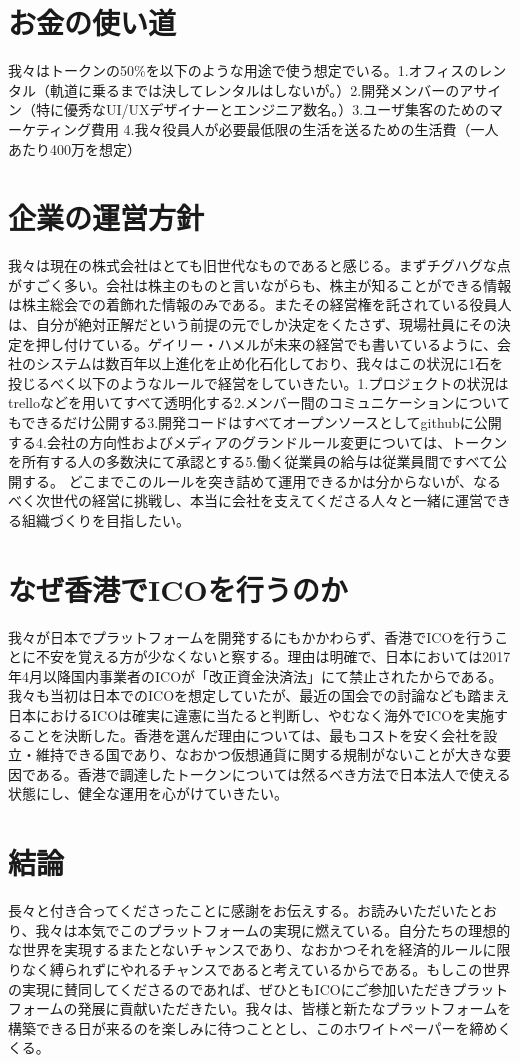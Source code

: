 \documentclass{jsarticle}
\begin{document}
\section{お金の使い道}
我々はトークンの50\%を以下のような用途で使う想定でいる。1.オフィスのレンタル（軌道に乗るまでは決してレンタルはしないが。）2.開発メンバーのアサイン（特に優秀なUI/UXデザイナーとエンジニア数名。）3.ユーザ集客のためのマーケティング費用 4.我々役員人が必要最低限の生活を送るための生活費（一人あたり400万を想定）
\section{企業の運営方針}
我々は現在の株式会社はとても旧世代なものであると感じる。まずチグハグな点がすごく多い。会社は株主のものと言いながらも、株主が知ることができる情報は株主総会での着飾れた情報のみである。またその経営権を託されている役員人は、自分が絶対正解だという前提の元でしか決定をくたさず、現場社員にその決定を押し付けている。ゲイリー・ハメルが未来の経営でも書いているように、会社のシステムは数百年以上進化を止め化石化しており、我々はこの状況に1石を投じるべく以下のようなルールで経営をしていきたい。1.プロジェクトの状況はtrelloなどを用いてすべて透明化する2.メンバー間のコミュニケーションについてもできるだけ公開する3.開発コードはすべてオープンソースとしてgithubに公開する4.会社の方向性およびメディアのグランドルール変更については、トークンを所有する人の多数決にて承認とする5.働く従業員の給与は従業員間ですべて公開する。 どこまでこのルールを突き詰めて運用できるかは分からないが、なるべく次世代の経営に挑戦し、本当に会社を支えてくださる人々と一緒に運営できる組織づくりを目指したい。
\section{なぜ香港でICOを行うのか}
我々が日本でプラットフォームを開発するにもかかわらず、香港でICOを行うことに不安を覚える方が少なくないと察する。理由は明確で、日本においては2017年4月以降国内事業者のICOが「改正資金決済法」にて禁止されたからである。我々も当初は日本でのICOを想定していたが、最近の国会での討論なども踏まえ日本におけるICOは確実に違憲に当たると判断し、やむなく海外でICOを実施することを決断した。香港を選んだ理由については、最もコストを安く会社を設立・維持できる国であり、なおかつ仮想通貨に関する規制がないことが大きな要因である。香港で調達したトークンについては然るべき方法で日本法人で使える状態にし、健全な運用を心がけていきたい。
\section{結論}
長々と付き合ってくださったことに感謝をお伝えする。お読みいただいたとおり、我々は本気でこのプラットフォームの実現に燃えている。自分たちの理想的な世界を実現するまたとないチャンスであり、なおかつそれを経済的ルールに限りなく縛られずにやれるチャンスであると考えているからである。もしこの世界の実現に賛同してくださるのであれば、ぜひともICOにご参加いただきプラットフォームの発展に貢献いただきたい。我々は、皆様と新たなプラットフォームを構築できる日が来るのを楽しみに待つこととし、このホワイトペーパーを締めくくる。
\end{document}
